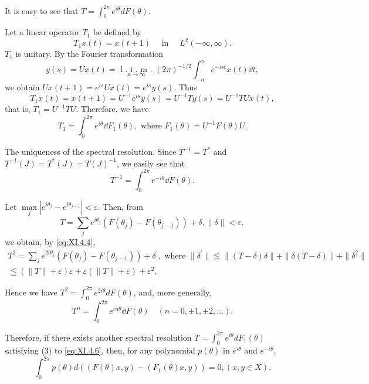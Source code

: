 It is easy to see that $T = \int_{0}^{2\pi} e^{i\theta} dF(\theta)$. 


\begin{example}\label{ex:XI.4.Example.2} Let a linear operator $T_{1}$ be defined by 
\[
T _{1} x (t) = x (t + 1) \quad \text{ in } \quad L ^{2} (- \infty , \infty).
\]
$T_{1}$ is unitary. By the Fourier transformation 
\[
y (s) = U x (t) = \underset {n \rightarrow \infty} {\text{ l . i . m . }} (2 \pi) ^{-1/2} \int_{-n} ^{n} e ^{-ist} x (t) \dd t,
\]
we obtain $Ux(t + 1) = e^{is}Ux(t) = e^{is}y(s)$. Thus 
\[
T _{1} x (t) = x (t + 1) = U ^{-1} e ^{is} y (s) = U ^{-1} T y (s) = U ^{-1} T U x (t),
\]
that is, $T_{1} = U^{-1}TU$. Therefore, we have 
\[
T _{1} = \int_{0} ^{2 \pi} e ^{i \theta} \dd F _{1} (\theta), \text{ where } F _{1} (\theta) = U ^{-1} F (\theta) U.
\]
\end{example}

The uniqueness of the spectral resolution. Since $T^{-1} = T^{*}$ and $T^{-1}(J) = T^{*}(J) = T(J)^{-1}$, we easily see that 
\begin{equation}\label{eq:XI.4.7}
T ^{-1} = \int_{0} ^{2 \pi} e ^{- i \theta} \dd F (\theta).
\end{equation}

Let $\max\limits_{j}|e^{i\theta_j} - e^{i\theta_{j-1}}| < \varepsilon$. Then, from 
\[
T = \sum\limits_{j} e ^ {i \theta_{j}} (F (\theta_{j}) - F (\theta_{j-1})) + \delta , \| \delta \| < \varepsilon ,
\]
we obtain, by \eqref{eq:XI.4.4}, 
\[
\begin{gathered}
T ^{2} = \sum\limits_{j} e ^ {2 i \theta_{j}} (F (\theta_{j}) - F (\theta_{j-1})) + \delta^{\prime}, \text{ where } \| \delta^{\prime} \| \leqq \| (T - \delta) \delta \| + \| \delta (T - \delta) \| + \| \delta^{2} \|
\\
\leqq (\| T \| + \varepsilon) \varepsilon + \varepsilon (\| T \| + \varepsilon) + \varepsilon^{2}.
\end{gathered}
\]

Hence we have $T^2 = \int_0^{2\pi} e^{2i\theta} dF(\theta)$, and, more generally, 
\begin{equation}\label{eq:XI.4.8}
T ^{n} = \int_{0} ^{2 \pi} e ^{i n \theta} \dd F (\theta) \quad (n = 0, \pm 1, \pm 2, \dots).
\end{equation}

Therefore, if there exists another spectral resolution $T = \int_{0}^{2\pi} e^{i\theta} dF_1(\theta)$ satisfying ($3$) to \eqref{eq:XI.4.6}, then, for any polynomial $p(\theta)$ in $e^{i\theta}$ and $e^{-i\theta}$, 
\[
\int_{0} ^{2 \pi} p (\theta) d ((F (\theta) x, y) - (F _{1} (\theta) x, y)) = 0, (x, y \in X).
\]

